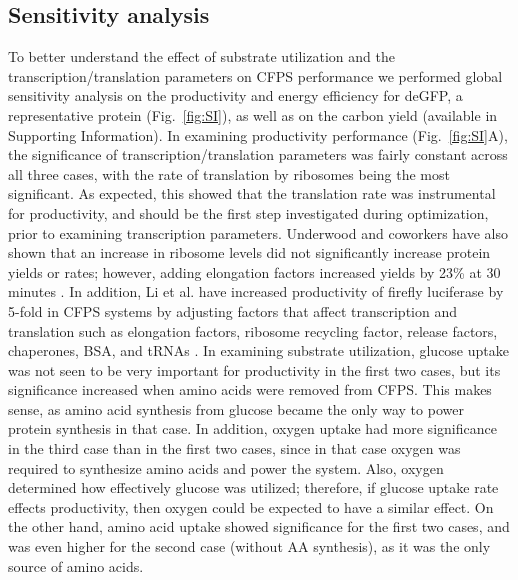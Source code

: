 \documentclass[journal=asbcd6,manuscript=article]{achemso}
\begin{document}
\subsection{Sensitivity analysis}
To better understand the effect of substrate utilization and the transcription/translation parameters on CFPS performance we performed global sensitivity analysis on the productivity and energy efficiency for deGFP, a representative protein (Fig.~\ref{fig:SI}), as well as on the carbon yield (available in Supporting Information).
In examining productivity performance (Fig.~\ref{fig:SI}A), the significance of transcription/translation parameters was fairly constant across all three cases, with the rate of translation by ribosomes being the most significant.
As expected, this showed that the translation rate was instrumental for productivity, and should be the first step investigated during optimization, prior to examining transcription parameters.
Underwood and coworkers have also shown that an increase in ribosome levels did not significantly increase protein yields or rates; however, adding elongation factors increased yields by 23\% at 30 minutes \cite{2005_underwood_biotech}.
In addition, Li et al. have increased productivity of firefly luciferase by 5-fold in CFPS systems by adjusting factors that affect transcription and translation such as elongation factors, ribosome recycling factor, release factors, chaperones, BSA, and tRNAs \cite{2014_li_PlosOne}.
In examining substrate utilization, glucose uptake was not seen to be very important for productivity in the first two cases, but its significance increased when amino acids were removed from CFPS.
This makes sense, as amino acid synthesis from glucose became the only way to power protein synthesis in that case.
In addition, oxygen uptake had more significance in the third case than in the first two cases, since in that case oxygen was required to synthesize amino acids and power the system.
Also, oxygen determined how effectively glucose was utilized; therefore, if glucose uptake rate effects productivity, then oxygen could be expected to have a similar effect.
On the other hand, amino acid uptake showed significance for the first two cases, and was even higher for the second case (without AA synthesis), as it was the only source of amino acids.
\end{document}
